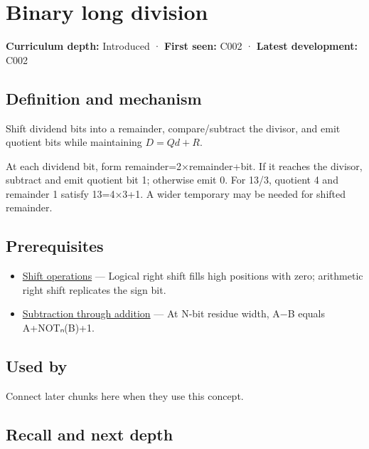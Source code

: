 \hypertarget{appendix-89985e6a2685}{}\label{referencestart:appendix-89985e6a2685}
\section{Binary long division}\label{appendix-89985e6a2685-binary-long-division}

\textbf{Curriculum depth:} Introduced · \textbf{First seen:} C002 · \textbf{Latest development:} C002

\subsection{Definition and mechanism}\label{appendix-89985e6a2685-definition-and-mechanism}

Shift dividend bits into a remainder, compare/subtract the divisor, and emit quotient bits while maintaining \(D=Qd+R\).

At each dividend bit, form remainder=2×remainder+bit. If it reaches the divisor, subtract and emit quotient bit 1; otherwise emit 0. For 13/3, quotient 4 and remainder 1 satisfy 13=4×3+1. A wider temporary may be needed for shifted remainder.

\subsection{Prerequisites}\label{appendix-89985e6a2685-prerequisites}

\begin{itemize}
\tightlist
\item
  \hyperref[appendix-73425b25118e]{Shift operations} --- Logical right shift fills high positions with zero; arithmetic right shift replicates the sign bit.
\item
  \hyperref[appendix-1c7df340573e]{Subtraction through addition} --- At N-bit residue width, A−B equals A+NOTₙ(B)+1.
\end{itemize}

\subsection{Used by}\label{appendix-89985e6a2685-used-by}

Connect later chunks here when they use this concept.

\subsection{Recall and next depth}\label{appendix-89985e6a2685-recall-and-next-depth}

